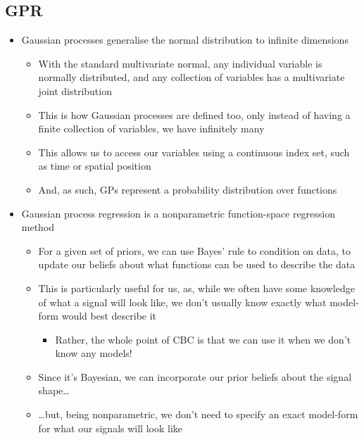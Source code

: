 \documentclass[11pt]{article}
\begin{document}
\subsection{GPR}
\label{sec:orgef80547}
\begin{itemize}
\item Gaussian processes generalise the normal distribution to infinite dimensions
\begin{itemize}
\item With the standard multivariate normal, any individual variable is normally distributed, and any collection of variables has a multivariate joint distribution
\item This is how Gaussian processes are defined too, only instead of having a finite collection of variables, we have infinitely many
\item This allows us to access our variables using a continuous index set, such as time or spatial position
\item And, as such, GPs represent a probability distribution over functions
\end{itemize}

\item Gaussian process regression is a nonparametric function-space regression method
\begin{itemize}
\item For a given set of priors, we can use Bayes' rule to condition on data, to update our beliefs about what functions can be used to describe the data
\item This is particularly useful for us, as, while we often have some knowledge of what a signal will look like, we don't usually know exactly what model-form would best describe it
\begin{itemize}
\item Rather, the whole point of CBC is that we can use it when we don't know any models!
\end{itemize}
\item Since it's Bayesian, we can incorporate our prior beliefs about the signal shape\ldots{}
\item \ldots{}but, being nonparametric, we don't need to specify an exact model-form for what our signals will look like
\end{itemize}


\end{itemize}
\end{document}
